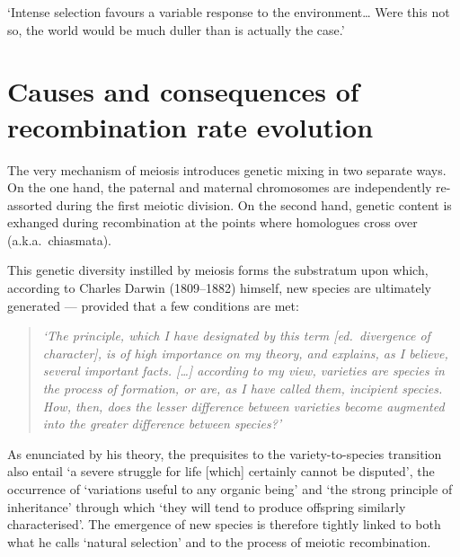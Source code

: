 \begin{savequote}[8cm]
‘Intense selection favours a variable response to the environment… Were this not so, the world would be much duller than is actually the case.’

\end{savequote}

\chapter{\label{ch:3-recombination-variation}Causes and consequences of recombination rate evolution} 

\minitoc{}


The very mechanism of meiosis introduces genetic mixing in two separate ways.
On the one hand, the paternal and maternal chromosomes are independently re-assorted during the first meiotic division.
On the second hand, genetic content is exhanged during recombination at the points where homologues cross over (a.k.a.\ chiasmata).

This genetic diversity instilled by meiosis forms the substratum upon which, according to Charles Darwin (1809--1882) himself, new species are ultimately generated — provided that a few conditions are met:

\begin{quote}
	\textit{‘The principle, which I have designated by this term [ed.\ divergence of character], is of high importance on my theory, and explains, as I believe, several important facts. […] according to my view, varieties are species in the process of formation, or are, as I have called them, incipient species. How, then, does the lesser difference between varieties become augmented into the greater difference between species?’}
\end{quote}

As enunciated by his theory, the prequisites to the variety-to-species transition also entail ‘a severe struggle for life [which] certainly cannot be disputed’, the occurrence of ‘variations useful to any organic being’ and ‘the strong principle of inheritance’ through which ‘they will tend to produce offspring similarly characterised’.
The emergence of new species is therefore tightly linked to both what he calls ‘natural selection’ and to the process of meiotic recombination.


